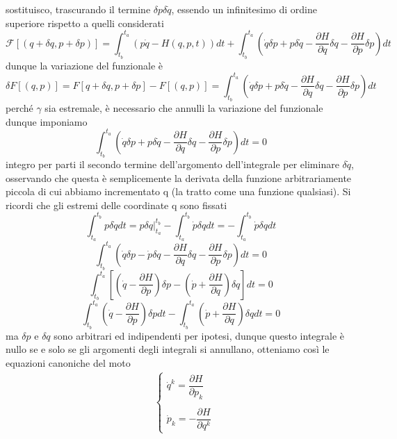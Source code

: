 \documentclass[
10pt, %
a4paper, %
oneside, %
headinclude,footinclude, %
BCOR5mm, %
]{scrartcl}
\begin{document}
sostituisco, trascurando il termine \(\delta p\delta\dot{q}\), essendo un infinitesimo di ordine superiore rispetto a quelli considerati
\[\mathcal{F}[(q+\delta q, p+\delta p)] = \int^{t_a}_{t_b}(p\dot{q}-H(q, p, t))dt+\int^{t_a}_{t_b}\left(\dot{q}\delta p+p\delta\dot{q}- \frac{\partial H}{\partial q}\delta q - \frac{\partial H}{\partial p}\delta p\right)dt\]
dunque la variazione del funzionale è 
\[\delta F[(q, p)] = F[q+\delta q, p+\delta p]-F[(q, p)] = \int^{t_a}_{t_b}\left(\dot{q}\delta p+p\delta\dot{q}- \frac{\partial H}{\partial q}\delta q - \frac{\partial H}{\partial p}\delta p\right)dt\]
perché $\gamma$ sia estremale, è necessario che annulli la variazione del funzionale dunque imponiamo
\[\int^{t_a}_{t_b}\left(\dot{q}\delta p+p\delta\dot{q}- \frac{\partial H}{\partial q}\delta q - \frac{\partial H}{\partial p}\delta p\right)dt = 0\]
integro per parti il secondo termine dell'argomento dell'integrale per eliminare $\delta\dot{q}$, osservando che questa è semplicemente la derivata della funzione arbitrariamente piccola di cui abbiamo incrementato q (la tratto come una funzione qualsiasi). Si ricordi che gli estremi delle coordinate q sono fissati 
\[\int_{t_a}^{t_b}p\delta\dot{q}dt = p\delta q|_{t_a}^{t_b}-\int_{t_a}^{t_b}\dot{p}\delta q dt = -\int_{t_a}^{t_b}\dot{p}\delta q dt\]
\[\int^{t_a}_{t_b}\left(\dot{q}\delta p-\dot{p}\delta q  - \frac{\partial H}{\partial q}\delta q - \frac{\partial H}{\partial p}\delta p\right)dt = 0\]
\[\int^{t_a}_{t_b}\left[\left(\dot{q}-\frac{\partial H}{\partial p}\right)\delta p- \left(\dot{p}+ \frac{\partial H}{\partial q}\right)\delta q\right] dt = 0\]
\[\int^{t_a}_{t_b}\left(\dot{q}-\frac{\partial H}{\partial p}\right)\delta p dt -  \int^{t_a}_{t_b}\left(\dot{p}+ \frac{\partial H}{\partial q}\right)\delta q dt = 0\]
ma $\delta p$ e $\delta q$ sono arbitrari ed indipendenti per ipotesi, dunque questo integrale è nullo se e solo se gli argomenti degli integrali si annullano, otteniamo così le equazioni canoniche del moto
\begin{align*}
	&\begin{cases}
		\dot{q}^k = \dfrac{\partial H}{\partial p_k}\\\\
		\dot{p}_k = -\dfrac{\partial H}{\partial q^k}
	\end{cases}
\end{align*}
\end{document}
